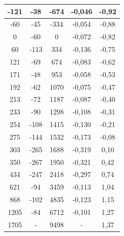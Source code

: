 \documentclass[a4paper,12pt]{article} %
\begin{document}
\begin{longtable}[c]{|c|c|c|c|c|}
		-121    & -38            & -674     & -0,046         & -0,92   \\ \hline
		-60     & -45            & -334     & -0,054         & -0,88   \\ \hline
		0       & -60            & 0        & -0,072         & -0,82   \\ \hline
		60      & -113           & 334      & -0,136         & -0,75   \\ \hline
		121     & -69            & 674      & -0,083         & -0,62   \\ \hline
		171     & -48            & 953      & -0,058         & -0,53   \\ \hline
		192     & -62            & 1070     & -0,075         & -0,47   \\ \hline
		213     & -72            & 1187     & -0,087         & -0,40   \\ \hline
		233     & -90            & 1298     & -0,108         & -0,31   \\ \hline
		254     & -108           & 1415     & -0,130         & -0,21   \\ \hline
		275     & -144           & 1532     & -0,173         & -0,08   \\ \hline
		303     & -265           & 1688     & -0,319         & 0,10    \\ \hline
		350     & -267           & 1950     & -0,321         & 0,42    \\ \hline
		434     & -247           & 2418     & -0,297         & 0,74    \\ \hline
		621     & -94            & 3459     & -0,113         & 1,04    \\ \hline
		868     & -102           & 4835     & -0,123         & 1,15    \\ \hline
		1205    & -84            & 6712     & -0,101         & 1,27    \\ \hline
		1705    & -              & 9498     & -              & 1,37    \\ \hline
	\end{longtable}
	
\end{document}

